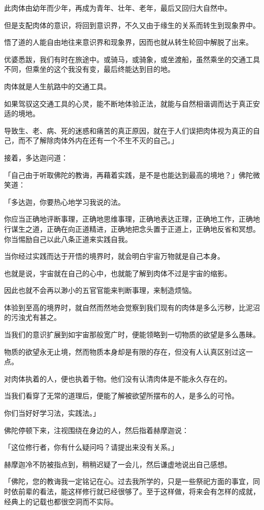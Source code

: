 \documentclass[twoside,openany]{book}
\begin{document}
此肉体由幼年而少年，再成为青年、壮年、老年，最后又回归大自然中。

但是支配肉体的意识，将回到意识界，不久又由于缘生的关系而转生到现象界中。

悟了道的人能自由地往来意识界和现象界，因而也就从转生轮回中解脱了出来。

优婆悉跋，我们有时在旅途中。或骑马，或骑象，或坐渡船，虽然乘坐的交通工具不同，但乘坐的这个我没有变，最后终能达到目的地。

肉体就是人生航路中的交通工具。

如果驾驭这交通工具的心灵，能不断地体验正法，就能与自然相谐调而达于真正安适的境地。

导致生、老、病、死的迷惑和痛苦的真正原因，就在于人们误把肉体视为真正的自己，而不了解除肉体外内在还有一个不生不灭的自己。」

接着，多达迦问道：

「自己由于听取佛陀的教诲，再藉着实践，是不是也能达到最高的境地？」佛陀微笑道：

「多达迦，你要热心地学习我说的法。

你应当正确地评断事理，正确地思维事理，正确地表达正理，正确地工作，正确地行谋生之道，正确在向正道精进，正确地把念头置于正道上，正确地反省和冥想。你当惕励自己以此八条正道来实践自我。

当你经过实践而达于开悟的境界时，就会明白宇宙万物就是自己本身。

也就是说，宇宙就在自己的心中，也就能了解到肉体不过是宇宙的缩影。

因此也就不会再以渺小的五官官能来判断事理，来制造烦恼。

体验到至高的境界时，就自然而然地会觉察到我们现有的肉体是多么污秽，比泥沼的污浊尤有甚之。

当我们的意识扩展到如宇宙那般宽广时，便能领略到一切物质的欲望是多么愚昧。

物质的欲望永无止境，然而物质本身却是有限的存在，但没有人认真区别过这一点。

对肉体执着的人，便也执着于物。他们没有认清肉体是不能永久存在的。

当我们看穿了无常的道理后，便能了解被欲望所摆布的人，是多么的可怜。

你们当好好学习法，实践法。」

佛陀停顿下来，注视围绕在身边的人，然后指着赫摩迦说：

「这位修行者，你有什么疑问吗？请提出来没有关系。」

赫摩迦冷不防被指点到，稍稍迟疑了一会儿，然后谦虚地说出自己感想。

「佛陀，您的教诲我一定铭记在心。过去我所学的，只是一些祭祀方面的事宜，同时依前辈的看法，能这样修行就已经很够了。至于这样做，将来会有怎样的成就，经典上的记载也都很空洞而不实际。
\end{document}
